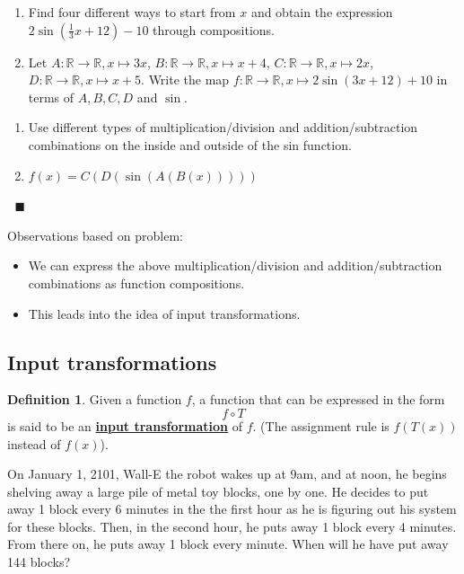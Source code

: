 \documentclass[11pt]{article}
\newenvironment{task}
	{\begin{mdframed}[linecolor=lightgray, linewidth=3pt]\raggedright}
	{\end{mdframed}}
\newcommand{\R}{\mathbb{R}}
\renewcommand\emph[1]{\underline{\bf{#1}}} %
\theoremstyle{definition}
\newtheorem{definition}[theorem]{Definition}
\newenvironment{solution}{{\it Solution.} }{\hfill {\color{lightgray}$\blacksquare$}}
\begin{document}
\vspace*{-3pt}
\begin{task}

\begin{enumerate}
\item Find four different ways to start from $x$ and obtain the expression $2\sin(\frac{1}{3}x+12)-10$ through compositions.
\item Let
	$A:\R\to\R, x\mapsto 3x$, \quad $B:\R\to \R, x\mapsto x+4$, \quad $C:\R\to \R,x\mapsto 2x$, \quad$D:\R\to \R,x\mapsto x+5$. Write the map $f:\R\to\R, x\mapsto 2\sin(3x+12)+10$ in terms of $A, B, C, D$ and $\sin$. 
\end{enumerate}
\end{task}


\begin{solution}
\begin{enumerate}
\item Use different types of multiplication/division and addition/subtraction combinations on the inside and outside of the sin function.
\item $f(x)= C(D(\sin(A(B(x)))))$
\end{enumerate} \vspace*{-8pt}$\;$
\vspace*{-10pt}
\end{solution}


Observations based on problem:
\begin{itemize}
\item We can express the above multiplication/division and addition/subtraction combinations as function compositions. 
\item This leads into the idea of input transformations.
\end{itemize}

\subsection{Input transformations}

\begin{definition}\label{d: input transformation}
Given a function $f$, a function that can be expressed in the form $$f\circ T$$ is said to be an \emph{input transformation} of $f$. (The assignment rule is $f(T(x))$ instead of $f(x)$).
\end{definition}

\begin{task}
On January 1, 2101, Wall-E the robot wakes up at 9am, and at noon, he begins shelving away a large pile of metal toy blocks, one by one. He decides to put away 1 block every 6 minutes in the the first hour as he is figuring out his system for these blocks. Then, in the second hour, he puts away 1 block every 4 minutes. From there on, he puts away 1 block every minute. When will he have put away 144 blocks?
\end{task}
\end{document}
